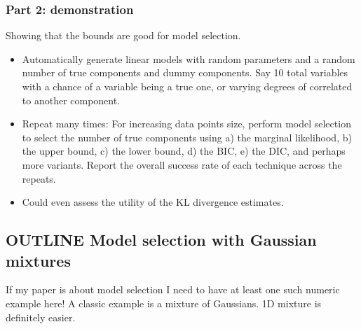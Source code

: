 \documentclass[10pt,a4paper]{article}
\begin{document}
\subsubsection{Part 2: demonstration}
Showing that the bounds are good for model selection.
\begin{itemize}
\item Automatically generate linear models with random parameters and a random number of true components and dummy components. Say 10 total variables with a chance of a variable being a true one, or varying degrees of correlated to another component.
\item Repeat many times: For increasing data points size, perform model selection to select the number of true components using a) the marginal likelihood, b) the upper bound, c) the lower bound, d) the BIC, e) the DIC, and perhaps more variants. Report the overall success rate of each technique across the repeats. 
\item Could even assess the utility of the KL divergence estimates.
\end{itemize}

\subsection{OUTLINE Model selection with Gaussian mixtures}
If my paper is about model selection I need to have at least one such numeric example here! A classic example is a mixture of Gaussians. 1D mixture is definitely easier.
\end{document}
